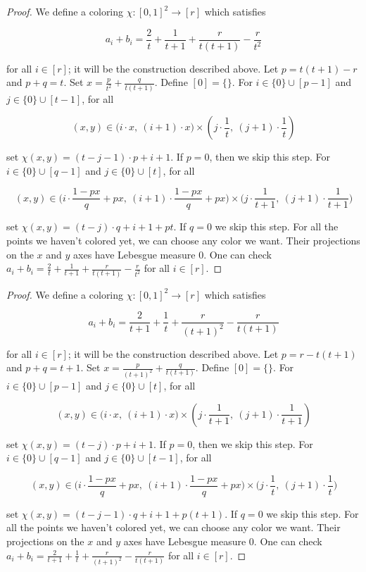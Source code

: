 \documentclass{article}
\begin{document}
\begin{proof}
We define a coloring $\chi : [0,1]^2 \rightarrow [r]$ which satisfies 

$$a_i + b_i = \frac{2}{t} + \frac{1}{t+1} + \frac{r}{t(t+1)} - \frac{r}{t^2}$$

\noindent 
for all $i \in [r]$; it will be the construction described above.  Let $p = t(t+1)-r$ and $p+q = t$. Set $x = \frac{p}{t^2}+\frac{q}{t(t+1)}$. Define $[0] = \{\}$. For $i \in \{0\} \cup [p-1]$ and $j \in \{0\} \cup [t-1]$, for all

$$(x,y) \in \biggl( i \cdot x, \ (i+1) \cdot x \biggl) \times \left( j \cdot \frac{1}{t}, \ (j+1) \cdot \frac{1}{t} \right)$$

\noindent
set $\chi(x,y) = (t-j-1) \cdot p + i + 1$.  If $p = 0$, then we skip this step. For $i \in \{0\} \cup [q-1]$ and $j \in \{0\} \cup [t]$, for all 

$$(x,y) \in \biggl(i \cdot \frac{1-px}{q} + px, \ (i+1) \cdot \frac{1-px}{q} + px \biggl) \times \biggl(j \cdot \frac{1}{t+1}, \ (j+1) \cdot \frac{1}{t+1} \biggl)$$

\noindent
set $\chi(x,y) = (t-j) \cdot q + i + 1 + pt$. If $q = 0$ we skip this step. For all the points we haven't colored yet, we can choose any color we want. Their projections on the $x$ and $y$ axes have Lebesgue measure 0.  One can check $a_i + b_i = \frac{2}{t} + \frac{1}{t+1} + \frac{r}{t(t+1)} - \frac{r}{t^2}$ for all $i \in [r]$. 

\end{proof}

\univtwo*

\begin{proof}
We define a coloring $\chi : [0,1]^2 \rightarrow [r]$ which satisfies 

$$a_i + b_i = \frac{2}{t+1}+\frac{1}{t}+\frac{r}{(t+1)^2}-\frac{r}{t(t+1)}$$

\noindent 
for all $i \in [r]$; it will be the construction described above.  Let $p = r-t(t+1)$ and $p+q = t+1$. Set $x = \frac{p}{(t+1)^2}+\frac{q}{t(t+1)}$. Define $[0] = \{\}$. For $i \in \{0\} \cup [p-1]$ and $j \in \{0\} \cup [t]$, for all

$$(x,y) \in \biggl( i \cdot x, \ (i+1) \cdot x \biggl) \times \left( j \cdot \frac{1}{t+1}, \ (j+1) \cdot \frac{1}{t+1} \right)$$

\noindent
set $\chi(x,y) = (t-j) \cdot p + i + 1$.  If $p = 0$, then we skip this step. For $i \in \{0\} \cup [q-1]$ and $j \in \{0\} \cup [t-1]$, for all 

$$(x,y) \in \biggl(i \cdot \frac{1-px}{q} + px, \ (i+1) \cdot \frac{1-px}{q} + px \biggl) \times \biggl(j \cdot \frac{1}{t}, \ (j+1) \cdot \frac{1}{t} \biggl)$$

\noindent
set $\chi(x,y) = (t-j-1) \cdot q + i + 1 + p(t+1)$. If $q = 0$ we skip this step. For all the points we haven't colored yet, we can choose any color we want. Their projections on the $x$ and $y$ axes have Lebesgue measure 0.  One can check $a_i + b_i = \frac{2}{t+1}+\frac{1}{t}+\frac{r}{(t+1)^2}-\frac{r}{t(t+1)}$ for all $i \in [r]$. 
\end{proof}
\end{document}
